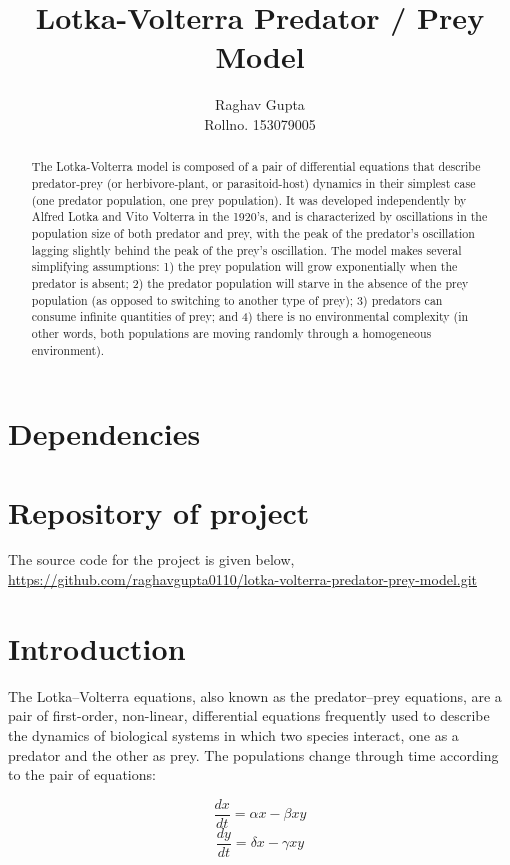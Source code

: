 \documentclass{article}
\title{Lotka-Volterra Predator / Prey Model}
\author{Raghav Gupta \\
		Rollno. 153079005}
\begin{document}
%

\maketitle
\newpage
\tableofcontents
\newpage
\listoffigures
\newpage

\begin{abstract}
The Lotka-Volterra model is composed of a pair of differential equations that describe predator-prey (or herbivore-plant, or parasitoid-host) dynamics in their simplest case (one predator population, one prey population). It was developed independently by Alfred Lotka and Vito Volterra in the 1920's, and is characterized by oscillations in the population size of both predator and prey, with the peak of the predator's oscillation lagging slightly behind the peak of the prey's oscillation. The model makes several simplifying assumptions: 1) the prey population will grow exponentially when the predator is absent; 2) the predator population will starve in the absence of the prey population (as opposed to switching to another type of prey); 3) predators can consume infinite quantities of prey; and 4) there is no environmental complexity (in other words, both populations are moving randomly through a homogeneous environment).
\end{abstract}

\newpage
\section{Dependencies}
\section{Repository of project}
The source code for the project is given below, \\
\url{https://github.com/raghavgupta0110/lotka-volterra-predator-prey-model.git}

\section{Introduction}
The Lotka–Volterra equations, also known as the predator–prey equations, are a pair of first-order, non-linear, differential equations frequently used to describe the dynamics of biological systems in which two species interact, one as a predator and the other as prey. The populations change through time according to the pair of equations:

\begin{equation*}
\dfrac{dx}{dt} = \alpha x - \beta xy
\end{equation*}
\begin{equation*}
\dfrac{dy}{dt} = \delta x - \gamma xy
\end{equation*}
\end{document}
